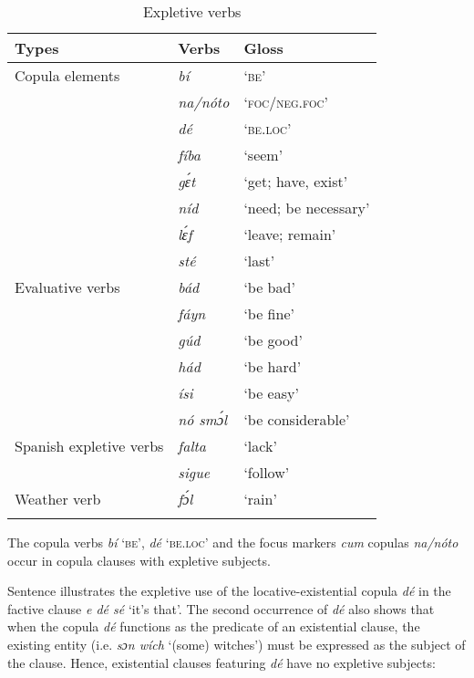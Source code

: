 \begin{table}
\caption{Expletive verbs}
\label{tab:key:9.6}

\begin{tabularx}{\textwidth}{XXX}
\lsptoprule

Types & Verbs & Gloss\\
\midrule
Copula elements & \itshape \textit{bí} & ‘\textsc{be’}\\
& \itshape \textit{na/nóto}  & \textsc{‘foc/neg.foc’}\\
& \itshape \textit{dé}  & \textsc{‘be.loc’}\\
& \itshape \textit{fíba} & ‘seem’\\
& \itshape gɛ́t & ‘get; have, exist’\\
& \itshape \textit{níd} & ‘need; be necessary’\\
& \itshape lɛ́f & ‘leave; remain’\\
& \itshape \textit{sté} & ‘last’\\
\tablevspace
Evaluative verbs & \itshape \textit{bád} & ‘be bad’\\
& \itshape \textit{fáyn} & ‘be fine’\\
& \itshape \textit{gúd} & ‘be good’\\
& \itshape \textit{hád} & ‘be hard’\\
& \itshape \textit{ísi} & ‘be easy’\\
& \itshape \textit{nó smɔ́l} & ‘be considerable’\\
\tablevspace
Spanish expletive verbs & \itshape \textit{falta} & ‘lack’\\
& \itshape \textit{sigue} & ‘follow’\\
\tablevspace
Weather verb & \itshape \textit{fɔ́l} & ‘rain’\\
\lspbottomrule
\end{tabularx}
\end{table}
The copula verbs \textit{bí} \textsc{‘be’,} \textit{dé} \textsc{‘be.loc’} and the focus markers \textit{cum} copulas \textit{na/nóto} occur in copula clauses with expletive subjects. 


Sentence  illustrates the expletive use of the locative-existential copula \textit{dé} in the factive clause \textit{e dé sé} ‘it’s that’. The second occurrence of \textit{dé} also shows that when the copula \textit{dé} functions as the predicate of an existential clause, the existing entity (i.e. \textit{sɔn wích} ‘(some) witches’) must be expressed as the subject of the clause. Hence, existential clauses featuring \textit{dé} have no expletive subjects: 



